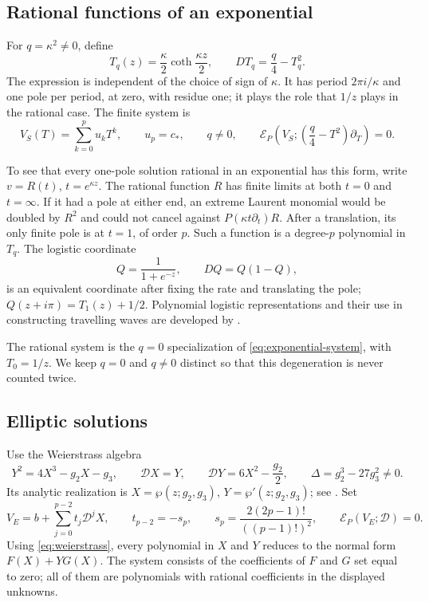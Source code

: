 \subsection{Rational functions of an exponential}

For \(q=\kappa^2\ne0\), define
\begin{equation}\label{eq:T}
 T_q(z)=\frac{\kappa}{2}\coth\frac{\kappa z}{2},
 \qquad
 DT_q=\frac q4-T_q^2.
\end{equation}
The expression is independent of the choice of sign of \(\kappa\).
It has period \(2\pi i/\kappa\) and one pole per period, at zero,
with residue one; it plays the role that \(1/z\) plays in the
rational case.
The finite system is
\begin{equation}\label{eq:exponential-system}
 V_S(T)=\sum_{k=0}^{p}u_kT^k,\qquad
 u_p=c_\ast,\qquad q\ne0,\qquad
 \mathcal E_P\left(V_S;\left(\frac q4-T^2\right)\partial_T\right)=0.
\end{equation}

To see that every one-pole solution rational in an exponential has
this form, write \(v=R(t)\), \(t=e^{\kappa z}\).
The rational function \(R\) has finite limits at both \(t=0\) and
\(t=\infty\). If it had a pole at either end, an extreme Laurent
monomial would be doubled by \(R^2\) and could not cancel against
\(P(\kappa t\partial_t)R\).
After a translation, its only finite pole is at \(t=1\), of order \(p\).
Such a function is a degree-\(p\) polynomial in \(T_q\).
The logistic coordinate
\[
 Q=\frac1{1+e^{-z}},\qquad DQ=Q(1-Q),
\]
is an equivalent coordinate after fixing the rate and translating the
pole; \(Q(z+i\pi)=T_1(z)+1/2\).
Polynomial logistic representations and their use in constructing
travelling waves are developed by
\citet{Kudryashov2012,Kudryashov2013,Kudryashov2015}.

The rational system is the \(q=0\) specialization of
\eqref{eq:exponential-system}, with \(T_0=1/z\).
We keep \(q=0\) and \(q\ne0\) distinct so that this degeneration is
never counted twice.

\subsection{Elliptic solutions}

Use the Weierstrass algebra
\begin{equation}\label{eq:weierstrass}
 Y^2=4X^3-g_2X-g_3,\qquad
 \mathscr D X=Y,\qquad
 \mathscr D Y=6X^2-\frac{g_2}{2},\qquad
 \Delta=g_2^3-27g_3^2\ne0.
\end{equation}
Its analytic realization is \(X=\wp(z;g_2,g_3)\),
\(Y=\wp'(z;g_2,g_3)\); see \citet[Chapter~23]{DLMF}.
Set
\begin{equation}\label{eq:elliptic-system}
 V_E=b+\sum_{j=0}^{p-2}t_j\mathscr D^jX,\qquad
 t_{p-2}=-s_p,\qquad
 s_p=\frac{2(2p-1)!}{((p-1)!)^2},
 \qquad
 \mathcal E_P(V_E;\mathscr D)=0.
\end{equation}
Using \eqref{eq:weierstrass}, every polynomial in \(X\) and \(Y\)
reduces to the normal form \(F(X)+YG(X)\). The system consists of
the coefficients of \(F\) and \(G\) set equal to zero; all of them
are polynomials with rational coefficients in the displayed unknowns.

